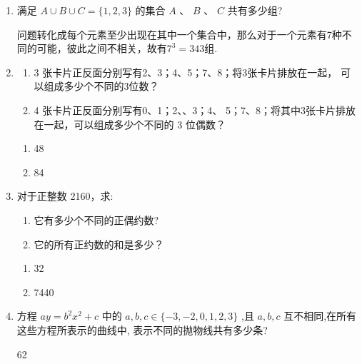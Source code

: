\begin{enumerate}
    \item 满足 $A \cup  B \cup  C = \{ 1,2,3\}$ 的集合 $A\text{ 、 }B\text{ 、 }C$ 共有多少组?
    \begin{jieda}
        问题转化成每个元素至少出现在其中一个集合中，那么对于一个元素有7种不同的可能，彼此之间不相关，故有$7^3 = 343$组.
    \end{jieda}

    \item 
    \begin{enumerate}
        \item 3 张卡片正反面分别写有2、3；4、5；7、8；将3张卡片排放在一起， 可以组成多少个不同的3位数？
        \item 4 张卡片正反面分别写有0、1；2、、3；4、 5；7、8；将其中3张卡片排放在一起，可以组成多少个不同的 3 位偶数？
    \end{enumerate}
    \begin{jieda}
        \begin{enumerate}
            \item 48
            \item 84
        \end{enumerate}
    \end{jieda}
    
    \item 对于正整数 2160，求:
    \begin{enumerate}
        \item 它有多少个不同的正偶约数?
        \item 它的所有正约数的和是多少？
    \end{enumerate}
    \begin{jieda}
        \begin{enumerate}
            \item 32
            \item 7440
        \end{enumerate}
    \end{jieda}
    
    \item 方程 ${ay} = {b}^{2}{x}^{2} + c$ 中的 $a,b,c \in  \{  - 3, - 2,0,1,2,3\}$ ,且 $a,b,c$ 互不相同,在所有这些方程所表示的曲线中, 表示不同的抛物线共有多少条?
    \begin{jieda}
        62
    \end{jieda}
    

\end{enumerate}
